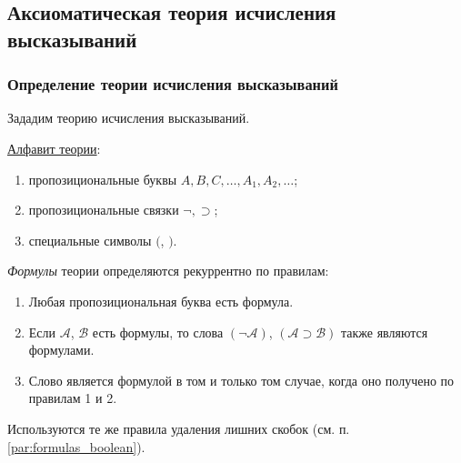 \subsection{Аксиоматическая теория исчисления высказываний}
\subsubsection{Определение теории исчисления высказываний}
Зададим теорию исчисления высказываний.

\underline{Алфавит теории}:
\begin{enumerate}
    \item пропозициональные буквы $A, B, C, \dots, A_1, A_2, \dots$;
    \item пропозициональные связки $\neg, \supset$;
    \item специальные символы $($, $)$.
\end{enumerate}
\textit{Формулы} теории определяются рекуррентно по правилам:
\begin{enumerate}
    \item Любая пропозициональная буква есть формула.
    \item Если $\mathcal{A}$, $\mathcal{B}$ есть формулы, то слова $(\neg\mathcal{A})$, $(\mathcal{A} \supset \mathcal{B})$ также являются формулами.
    \item Слово является формулой в том и только том случае, когда оно получено по правилам 1 и 2. 
\end{enumerate}
Используются те же правила удаления лишних скобок (см. п. \ref{par:formulas_boolean}).

